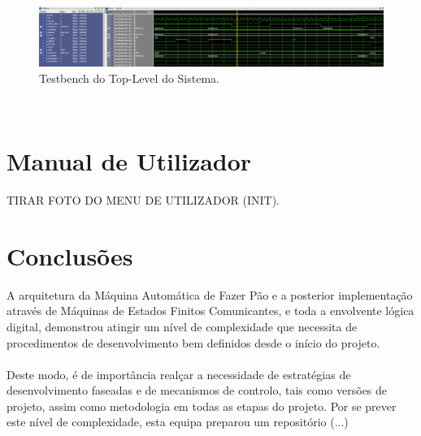 \documentclass{report}
\begin{document}
\begin{figure}[h!] %
	\center
	\includegraphics[width=335pt]{images/FSM2_TB_3}
	\caption{Testbench do Top-Level do Sistema.}
	\label{fig:imagem4}
\end{figure}
\\



\chapter{Manual de Utilizador}
\label{chap.manualUtilizador}
TIRAR FOTO DO MENU DE UTILIZADOR (INIT).

\chapter{Conclusões}
\label{chap.conclusao}
A arquitetura da Máquina Automática de Fazer Pão e a posterior implementação através de Máquinas de Estados Finitos Comunicantes, e toda a envolvente lógica digital, demonstrou atingir um nível de complexidade que necessita de procedimentos de desenvolvimento bem definidos desde o início do projeto.
\\\\
Deste modo, é de importância realçar a necessidade de estratégias de desenvolvimento faseadas e de mecanismos de controlo, tais como versões de projeto, assim como metodologia em todas as etapas do projeto. Por se prever este nível de complexidade, esta equipa preparou um repositório (...)






\printbibliography
\end{document}
